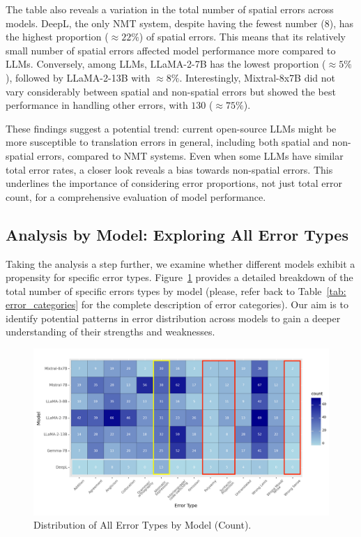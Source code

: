 The table also reveals a variation in the total number of spatial errors across models. DeepL, the only NMT system, despite having the fewest number ($8$), has the highest proportion ($\approx22\%$) of spatial errors. This means that its relatively small number of spatial errors affected model performance more compared to LLMs. Conversely, among LLMs, LLaMA-2-7B has the lowest proportion ($\approx5\%$), followed by LLaMA-2-13B with $\approx8\%$. Interestingly, Mixtral-8x7B did not vary considerably between spatial and non-spatial errors but showed the best performance in handling other errors, with $130$ ($\approx75\%$).

These findings suggest a potential trend: current open-source LLMs might be more susceptible to translation errors in general, including both spatial and non-spatial errors, compared to NMT systems. Even when some LLMs have similar total error rates, a closer look reveals a bias towards non-spatial errors. This underlines the importance of considering error proportions, not just total error count, for a comprehensive evaluation of model performance.


\subsection{Analysis by Model: Exploring All Error Types}

Taking the analysis a step further, we examine whether different models exhibit a propensity for specific error types. Figure~\ref{fig: error-types} provides a detailed breakdown of the total number of specific errors types by model (please, refer back to Table~\ref{tab: error_categories} for the complete description of error categories). Our aim is to identify potential patterns in error distribution across models to gain a deeper understanding of their strengths and weaknesses.

\begin{figure}[htb]
        \centering
        \includegraphics[width=1\textwidth]{textual/Figuras/Results/Unknown-44.png}
        \caption{Distribution of All Error Types by Model (Count).}
        \label{fig: error-types}
\end{figure}

